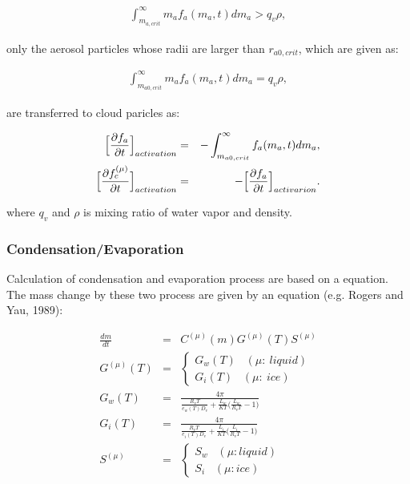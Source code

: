 \begin{eqnarray}
\int_{m_{a,crit}}^{\infty}m_{a}f_{a}(m_{a},t)dm_{a} > q_{v}\rho,\label{s10-6}
\end{eqnarray}

only the aerosol particles whose radii are larger than $r_{a0,crit}$, which are given as:

\begin{eqnarray}
\int_{m_{a0,crit}}^{\infty}m_{a}f_{a}(m_{a},t)dm_{a} = q_{v}\rho,\label{s10-7}
\end{eqnarray}


are transferred to cloud paricles as:

\begin{eqnarray}
\Bigl[\frac{\partial f_{a}}{\partial t}\Bigr]_{activation}&=&-\int_{m_{a0,crit}}^{\infty}f_{a}(m_{a},t)dm_{a},\label{s10-8}\\
\Bigl[\frac{\partial f_{c}^{(\mu)}}{\partial t}\Bigr]_{activation}&=&-\Bigl[\frac{\partial f_{a}}{\partial t}\Bigr]_{activarion}.\label{s10-9}
\end{eqnarray}

where $q_{v}$ and $\rho$ is mixing ratio of water vapor and density.

\subsubsection{Condensation/Evaporation}
Calculation of condensation and evaporation process are based on a equation. The mass change by these two process are given by an equation (e.g. Rogers and Yau, 1989\cite{ry_1989}):

\begin{eqnarray}
\frac{dm}{dt}&=&C^{(\mu)}(m)G^{(\mu)}(T)S^{(\mu)}\\
G^{(\mu)}(T)&=&
\left\{
\begin{array}{l}
G_{w}(T)\;\;\;(\mu : \:liquid)\\
G_{i}(T)\;\;\;(\mu : \:ice)
\end{array}\right. \nonumber\\
G_{w}(T)&=&\frac{4\pi}{\frac{R_{v}T}{e_{w}(T)D_{v}}+\frac{L_{w}}{KT}\bigl( \frac{L_{w}}{R_{v}T}-1\Bigr )}\nonumber\\
G_{i}(T)&=&\frac{4\pi}{\frac{R_{v}T}{e_{i}(T)D_{v}}+\frac{L_{i}}{KT}\bigl( \frac{L_{i}}{R_{v}T}-1\Bigr )}\nonumber\\
S^{(\mu)}&=&
\left\{
\begin{array}{l}
S_{w}\;\;\;(\mu : liquid)\\
S_{i}\;\;\;(\mu : ice)
\end{array}\right.\nonumber
\end{eqnarray}

